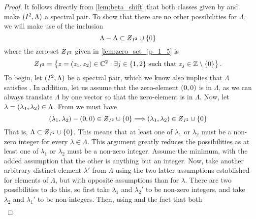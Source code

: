 \documentclass[../thesis.tex]{subfiles}
\begin{document}
\begin{proof}
    It follows directly from \cref{lem:beta_shift} that both classes given by  and  make $(I^2,\Lambda)$ a spectral pair. To show that there are no other possibilities for $\Lambda$, we will make use of the inclusion
    \begin{equation}\label{eq:inclusion_dim_2}
        \Lambda - \Lambda \subset \Zstroke_{I^2} \cup \braq{0}
    \end{equation}
    where the zero-set $\Zstroke_{I^2}$ given in \cref{lem:zero_set_jp_1_5} is
    \begin{equation}\label{eq:zeroset_dim_2}
        \Zstroke_{I^2} = \braqMed{z = \brac{z_1,z_2} \in \C^2 : \exists \space j \in \braq{1,2} \text{ such that } z_j \in \intnozero}.
    \end{equation}
    To begin, let $(I^2,\Lambda)$ be a spectral pair, which we know also implies that $\Lambda$ satisfies . In addition, let us assume that the zero-element $(0,0)$ is in $\Lambda$, as we can always translate $\Lambda$ by one vector so that the zero-element is in $\Lambda$. Now, let $\lambda = (\lambda_1,\lambda_2) \in \Lambda$. From  we must have
    \begin{equation*}%
        \brac{\lambda_1, \lambda_2} - \brac{0,0} \in \Zstroke_{I^2} \cup \braq{0} \Longrightarrow \brac{\lambda_1, \lambda_2} \in \Zstroke_{I^2} \cup \braq{0}
    \end{equation*}
    That is, $\Lambda \subset \Zstroke_{I^2} \cup \braq{0}$. This means that at least one of $\lambda_1$ or $\lambda_2$ must be a non-zero integer for every $\lambda \in \Lambda$. This argument greatly reduces the possibilities as at least one of $\lambda_1$ or $\lambda_2$ must be a non-zero integer. Assume the minimum, with the added assumption that the other is anything but an integer. Now, take another arbitrary distinct element $\lambda'$ from $\Lambda$ using the two latter assumptions established for elements of $\Lambda$, but with opposite assumptions than for $\lambda$. There are two possibilities to do this, so first take $\lambda_1$ and $\lambda_2'$ to be non-zero integers, and take $\lambda_2$ and $\lambda_1'$ to be non-integers. Then, using   and the fact that both 
    \begin{align*}

\end{align*}
\end{proof}
\end{document}
